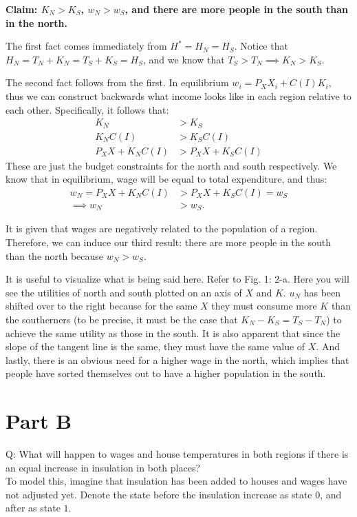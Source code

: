 \documentclass[12pt]{paper}
\begin{document}
\textbf{Claim: $K_N>K_S$, $w_N>w_S$, and there are more people in the south than in the north.}

The first fact comes immediately from $H^*=H_N=H_S.$ Notice that $H_N=T_N+K_N=T_S+K_S=H_S$, and we know that $T_S>T_N \implies K_N>K_S$.

The second fact follows from the first. In equilibrium $w_i=P_XX_i+C(I)K_i,$ thus we can construct backwards what income looks like in each region relative to each other. Specifically, it follows that:
\begin{align*}
K_N&>K_S\\
K_NC(I)&>K_SC(I)\\
P_XX+K_NC(I)&>P_XX+K_SC(I)
\end{align*}
These are just the budget constraints for the north and south respectively. We know that in equilibrium, wage will be equal to total expenditure, and thus:
\begin{align*}
w_N=P_XX+K_NC(I)&>P_XX+K_SC(I)=w_S\\
\implies w_N&>w_S.
\end{align*}

It is given that wages are negatively related to the population of a region. Therefore, we can induce our third result: there are more people in the south than the north because $w_N>w_S$.

It is useful to visualize what is being said here. Refer to Fig. 1: 2-a.  Here you will see the utilities of north and south plotted on an axis of $X$ and $K$. $u_N$ has been shifted over to the right because for the same $X$ they must consume more $K$ than the southerners (to be precise, it must be the case that $K_N-K_S=T_S-T_N$) to achieve the same utility as those in the south. It is also apparent that since the slope of the tangent line is the same, they must have the same value of $X$. And lastly, there is an obvious need for a higher wage in the north, which implies that people have sorted themselves out to have a higher population in the south.

\section{Part B}
Q: What will happen to wages and house temperatures in both regions if there is an equal increase in insulation in both places?
\\

To model this, imagine that insulation has been added to houses and wages have not adjusted yet. Denote the state before the insulation increase as state $0$, and after as state $1$.
\end{document}
